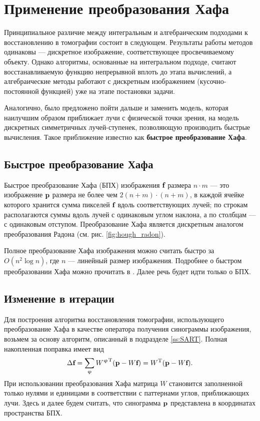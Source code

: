 \section{Применение преобразования Хафа}
Принципиальное различие между интегральным и алгебраическим подходами к восстановлению в томографии состоит в следующем. Результаты работы методов одинаковы --- дискретное изображение, соответствующее просвечиваемому объекту. Однако алгоритмы, основанные на интегральном подходе, считают восстанавливаемую функцию непрерывной вплоть до этапа вычислений, а алгебраические методы работают с дискретным изображением (кусочно-постоянной функцией) уже на этапе постановки задачи.

Аналогично, было предложено пойти дальше и заменить модель, которая наилучшим образом приближает лучи с физической точки зрения, на модель дискретных симметричных лучей-ступенек, позволяющую производить быстрые вычисления. Такое приближение известно как \textbf{быстрое преобразование Хафа}.

\subsection{Быстрое преобразование Хафа}
Быстрое преобразование Хафа (БПХ) изображения $\textbf f$ размера $n \cdot  m$ --- это изображение $\textbf p$ размера не более чем $2(n+m) \cdot (n+m)$, в каждой ячейке которого хранится сумма пикселей $\textbf f$ вдоль соответствующих лучей; по строкам располагаются суммы вдоль лучей с одинаковым углом наклона, а по столбцам --- с одинаковым отступом. Преобразование Хафа является дискретным аналогом преобразования Радона (см. рис. \ref{fig:hough_radon}).

Полное преобразование Хафа изображения можно считать быстро за $O(n^2\log n)$, где $n$ --- линейный размер изображения. Подробнее о быстром преобразовании Хафа можно прочитать в \cite{hough}. Далее речь будет идти только о БПХ.

\subsection{Изменение в итерации}
Для построения алгоритма восстановления томографии, использующего преобразование Хафа в качестве оператора получения синограммы изображения, возьмем за основу алгоритм, описанный в подразделе \ref{ss:SART}. Полная накопленная поправка имеет вид
\begin{equation}
\label{eq:sum}
\Delta \textbf f = \sum_\varphi {{W^\varphi}^{\mathrm T}(\textbf p - W\textbf f) } = W^{\mathrm T}(\textbf p - W \textbf f).
\end{equation}
При использовании преобразования Хафа матрица $W$ становится заполненной только нулями и единицами в соответствии с паттернами углов, приближающих лучи. Здесь и далее будем считать, что синограмма $\textbf p$ представлена в координатах пространства БПХ.
